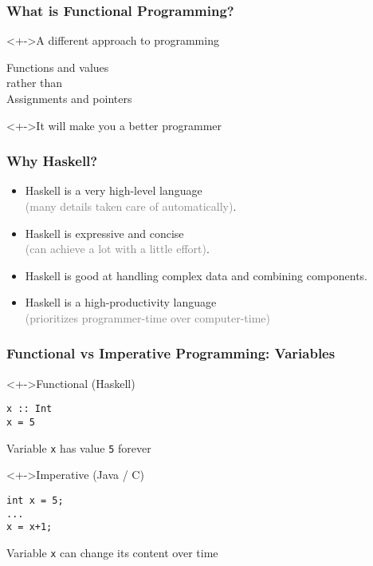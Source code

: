 \documentclass{beamer}
\begin{document}
\begin{frame}
  \frametitle{What is Functional Programming?}
  \begin{block}<+->{A different approach to programming}
    \begin{LARGE}
      \begin{center}
        Functions and values
        \\[3ex]
        rather than
        \\[3ex]
        Assignments and pointers
      \end{center}
    \end{LARGE}
  \end{block}
  \begin{alertblock}<+->{It will make you a better programmer}
    
  \end{alertblock}
\end{frame}
\begin{frame}
  \frametitle{Why Haskell?}
  \begin{itemize}
  \item Haskell is a very high-level language
    \\\hfill\textcolor{gray}{(many details taken care
    of automatically)}. 
  \item Haskell is expressive and concise
    \\\hfill\textcolor{gray}{(can achieve a lot with a
    little effort)}. 
  \item Haskell is good at handling complex data and combining
    components. 
  \item Haskell is a high-productivity language \\\hfill\textcolor{gray}{ (prioritizes programmer-time over computer-time)}
  \end{itemize}
\end{frame}

\begin{frame}[fragile]
  \frametitle{Functional vs Imperative Programming: Variables}
  \begin{block}<+->{Functional (Haskell)}
\begin{verbatim}
x :: Int
x = 5
\end{verbatim}
    Variable \texttt{x} has value \texttt{5} forever
  \end{block}
  \begin{block}<+->{Imperative (Java / C)}
\begin{verbatim}
int x = 5;
...
x = x+1;
\end{verbatim}
    Variable \texttt{x} can change its content over time
  \end{block}
\end{frame}
\end{document}
